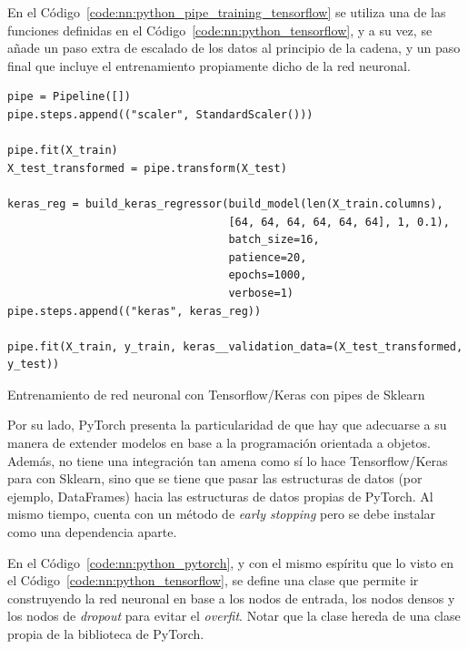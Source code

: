 \documentclass[11pt]{article}
\newcommand{\english}[1]{\textit{#1}}
\begin{document}
En el Código~\ref{code:nn:python_pipe_training_tensorflow} se utiliza una de las funciones definidas en el Código~\ref{code:nn:python_tensorflow}, y a su vez, se añade un paso extra de escalado de los datos al principio de la cadena, y un paso final que incluye el entrenamiento propiamente dicho de la red neuronal. 

\begin{listing}
\begin{verbatim}
pipe = Pipeline([])
pipe.steps.append(("scaler", StandardScaler()))

pipe.fit(X_train)
X_test_transformed = pipe.transform(X_test)

keras_reg = build_keras_regressor(build_model(len(X_train.columns),
                                  [64, 64, 64, 64, 64, 64], 1, 0.1),
                                  batch_size=16,
                                  patience=20,
                                  epochs=1000,
                                  verbose=1)
pipe.steps.append(("keras", keras_reg))

pipe.fit(X_train, y_train, keras__validation_data=(X_test_transformed, y_test))
\end{verbatim}
\caption{Entrenamiento de red neuronal con Tensorflow/Keras con pipes de Sklearn}
\label{code:nn:python_pipe_training_tensorflow}
\end{listing}

Por su lado, PyTorch presenta la particularidad de que hay que adecuarse a su manera de extender modelos en base a la programación orientada a objetos. Además, no tiene una integración tan amena como sí lo hace Tensorflow/Keras para con Sklearn, sino que se tiene que pasar las estructuras de datos (por ejemplo, DataFrames) hacia las estructuras de datos propias de PyTorch. Al mismo tiempo, cuenta con un método de \english{early stopping} pero se debe instalar como una dependencia aparte.

En el Código~\ref{code:nn:python_pytorch}, y con el mismo espíritu que lo visto en el Código~\ref{code:nn:python_tensorflow}, se define una clase que permite ir construyendo la red neuronal en base a los nodos de entrada, los nodos densos y los nodos de \english{dropout} para evitar el \english{overfit}. Notar que la clase hereda de una clase propia de la biblioteca de PyTorch.
\end{document}
